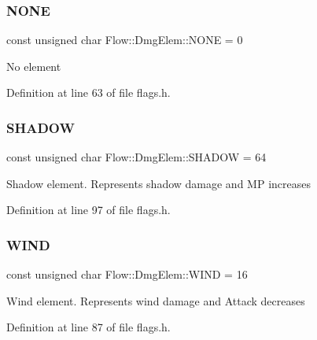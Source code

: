 \subsubsection{\texorpdfstring{N\+O\+NE}{NONE}}
{\footnotesize\ttfamily const unsigned char Flow\+::\+Dmg\+Elem\+::\+N\+O\+NE = 0}

No element 

Definition at line 63 of file flags.\+h.

\hypertarget{namespace_flow_1_1_dmg_elem_a97d51ad54a8dceed5f5f3e0e856453e1}{}\label{namespace_flow_1_1_dmg_elem_a97d51ad54a8dceed5f5f3e0e856453e1} 
\subsubsection{\texorpdfstring{S\+H\+A\+D\+OW}{SHADOW}}
{\footnotesize\ttfamily const unsigned char Flow\+::\+Dmg\+Elem\+::\+S\+H\+A\+D\+OW = 64}

Shadow element. Represents shadow damage and MP increases 

Definition at line 97 of file flags.\+h.

\hypertarget{namespace_flow_1_1_dmg_elem_ab161888a4cffbc8799e450085f9411b9}{}\label{namespace_flow_1_1_dmg_elem_ab161888a4cffbc8799e450085f9411b9} 
\subsubsection{\texorpdfstring{W\+I\+ND}{WIND}}
{\footnotesize\ttfamily const unsigned char Flow\+::\+Dmg\+Elem\+::\+W\+I\+ND = 16}

Wind element. Represents wind damage and Attack decreases 

Definition at line 87 of file flags.\+h.

